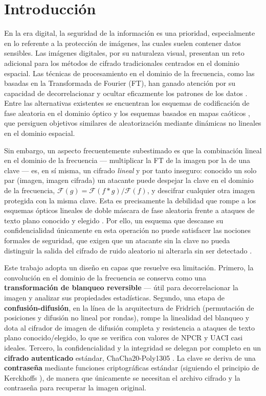 \documentclass{llncs}
\begin{document}
\section{Introducci\'on}

En la era digital, la seguridad de la informaci\'on es una prioridad,
especialmente en lo referente a la protecci\'on de im\'agenes, las cuales
suelen contener datos sensibles. Las im\'agenes digitales, por su
naturaleza visual, presentan un reto adicional para los m\'etodos de
cifrado tradicionales centrados en el dominio espacial. Las t\'ecnicas de
procesamiento en el dominio de la frecuencia, como las basadas en la
Transformada de Fourier (FT), han ganado atenci\'on por su capacidad de
decorrelacionar y ocultar eficazmente los patrones de los datos
\cite{refregier,unnikrishnan}. Entre las alternativas existentes se
encuentran los esquemas de codificaci\'on de fase aleatoria en el dominio
\'optico \cite{javidi} y los esquemas basados en mapas ca\'oticos
\cite{chaos1,chaos2}, que persiguen objetivos similares de aleatorizaci\'on
mediante din\'amicas no lineales en el dominio espacial.

Sin embargo, un aspecto frecuentemente subestimado es que la combinaci\'on
lineal en el dominio de la frecuencia --- multiplicar la FT de la imagen
por la de una clave --- es, en s\'i misma, un cifrado \emph{lineal} y por
tanto inseguro: conocido un solo par (imagen, imagen cifrada) un atacante
puede despejar la clave en el dominio de la frecuencia,
$\mathcal{F}(g) = \mathcal{F}(f*g)/\mathcal{F}(f)$, y descifrar cualquier
otra imagen protegida con la misma clave. Esta es precisamente la debilidad
que rompe a los esquemas \'opticos lineales de doble m\'ascara de fase
aleatoria frente a ataques de texto plano conocido y elegido
\cite{peng,frauel}. Por ello, un esquema que descanse su confidencialidad
\'unicamente en esta operaci\'on no puede satisfacer las nociones formales
de seguridad, que exigen que un atacante sin la clave no pueda distinguir
la salida del cifrado de ruido aleatorio ni alterarla sin ser detectado
\cite{bellare,aead}.

Este trabajo adopta un dise\~no en capas que resuelve esa limitaci\'on.
Primero, la convoluci\'on en el dominio de la frecuencia se conserva como una
\textbf{transformaci\'on de blanqueo reversible} --- \'util para
decorrelacionar la imagen y analizar sus propiedades estad\'isticas. Segundo,
una etapa de \textbf{confusi\'on-difusi\'on}, en la l\'inea de la arquitectura
de Fridrich \cite{fridrich} (permutaci\'on de posiciones y difusi\'on no
lineal por rondas), rompe la linealidad del blanqueo y dota al cifrador de
imagen de difusi\'on completa y resistencia a ataques de texto plano
conocido/elegido, lo que se verifica con valores de NPCR y UACI casi ideales.
Tercero, la confidencialidad y la integridad se delegan por completo en un
\textbf{cifrado autenticado} est\'andar, ChaCha20-Poly1305 \cite{rfc8439}.
La clave se deriva de una \textbf{contrase\~na} mediante funciones
criptogr\'aficas est\'andar (siguiendo el principio de Kerckhoffs
\cite{kerckhoffs}), de manera que \'unicamente se necesitan el archivo
cifrado y la contrase\~na para recuperar la imagen original.
\end{document}
